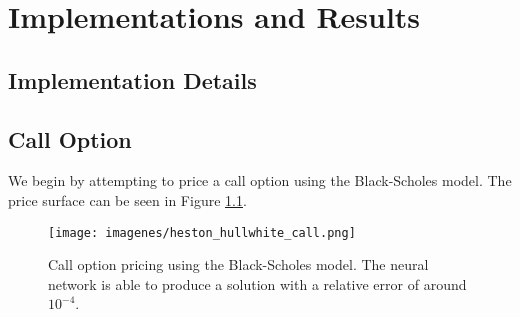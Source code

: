 \documentclass[12pt]{report} %
\theoremstyle{plain}           %
\theoremstyle{definition}      %
\theoremstyle{remark}          %
\begin{document}






\chapter{Implementations and Results}
\section{Implementation Details}
\section{Call Option}
We begin by attempting to price a call option using the Black-Scholes model. The price surface can be 
seen in Figure \ref{fig:call_option}.
\begin{figure}[H]
	\centering
	\texttt{[image: imagenes/heston\_hullwhite\_call.png]}
	\caption{Call option pricing using the Black-Scholes model. The neural network 
	is able to produce a solution with a relative error of around $10^{-4}$.}
	\label{fig:call_option}
\end{figure}
\end{document}
